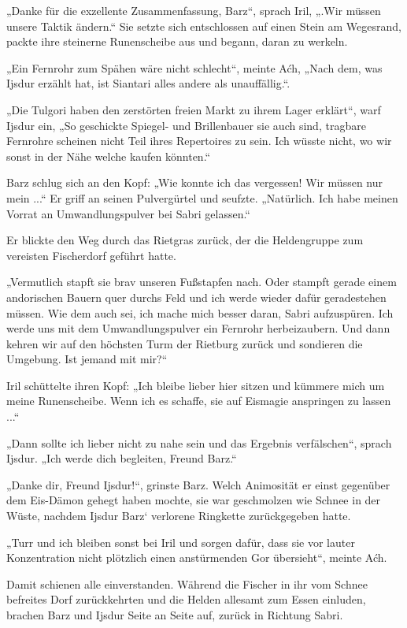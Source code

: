 „Danke für die exzellente Zusammenfassung, Barz“, sprach Iril, „.Wir müssen unsere Taktik ändern.“ Sie setzte sich entschlossen auf einen Stein am Wegesrand, packte ihre steinerne Runenscheibe aus und begann, daran zu werkeln.

„Ein Fernrohr zum Spähen wäre nicht schlecht“, meinte Aćh, „Nach dem, was Ijsdur erzählt hat, ist Siantari alles andere als unauffällig.“.

„Die Tulgori haben den zerstörten freien Markt zu ihrem Lager erklärt“, warf Ijsdur ein, „So geschickte Spiegel- und Brillenbauer sie auch sind, tragbare Fernrohre scheinen nicht Teil ihres Repertoires zu sein. Ich wüsste nicht, wo wir sonst in der Nähe welche kaufen könnten.“

Barz schlug sich an den Kopf: „Wie konnte ich das vergessen! Wir müssen nur mein ...“ Er griff an seinen Pulvergürtel und seufzte. „Natürlich. Ich habe meinen Vorrat an Umwandlungspulver bei Sabri gelassen.“

Er blickte den Weg durch das Rietgras zurück, der die Heldengruppe zum vereisten Fischerdorf geführt hatte.

„Vermutlich stapft sie brav unseren Fußstapfen nach. Oder stampft gerade einem andorischen Bauern quer durchs Feld und ich werde wieder dafür geradestehen müssen. Wie dem auch sei, ich mache mich besser daran, Sabri aufzuspüren. Ich werde uns mit dem Umwandlungspulver ein Fernrohr herbeizaubern. Und dann kehren wir auf den höchsten Turm der Rietburg zurück und sondieren die Umgebung. Ist jemand mit mir?“

Iril schüttelte ihren Kopf: „Ich bleibe lieber hier sitzen und kümmere mich um meine Runenscheibe. Wenn ich es schaffe, sie auf Eismagie anspringen zu lassen ...“

„Dann sollte ich lieber nicht zu nahe sein und das Ergebnis verfälschen“, sprach Ijsdur. „Ich werde dich begleiten, Freund Barz.“

„Danke dir, Freund Ijsdur!“, grinste Barz. Welch Animosität er einst gegenüber dem Eis-Dämon gehegt haben mochte, sie war geschmolzen wie Schnee in der Wüste, nachdem Ijsdur Barz‘ verlorene Ringkette zurückgegeben hatte.

„Turr und ich bleiben sonst bei Iril und sorgen dafür, dass sie vor lauter Konzentration nicht plötzlich einen anstürmenden Gor übersieht“, meinte Aćh.

Damit schienen alle einverstanden. Während die Fischer in ihr vom Schnee befreites Dorf zurückkehrten und die Helden allesamt zum Essen einluden, brachen Barz und Ijsdur Seite an Seite auf, zurück in Richtung Sabri.

